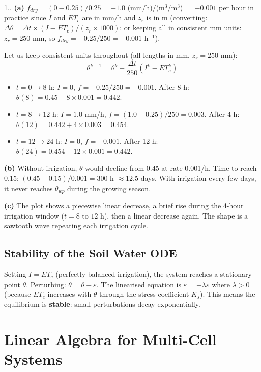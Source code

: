 \documentclass[12pt,a4paper,openany]{book}
\newcounter{exoctr}[chapter]
\renewcommand{\theexoctr}{\thechapter.\arabic{exoctr}}
\begin{document}
\begin{solbox}{1.\theexoctr}
\textbf{(a)} $f_{dry}=(0-0.25)/0.25=-1.0$ (mm/h)/(m$^3$/m$^3$) $= -0.001$ per hour in practice since $I$ and $ET_c$ are in mm/h and $z_r$ is in m (converting: $\Delta\theta = \Delta t \times (I-ET_c)/(z_r \times 1000)$; or keeping all in consistent mm units: $z_r=250$ mm, so $f_{dry}=-0.25/250=-0.001$ h$^{-1}$).

Let us keep consistent units throughout (all lengths in mm, $z_r=250$ mm):
\[\theta^{k+1}=\theta^k+\frac{\Delta t}{250}(I^k-ET_c^k)\]
\begin{itemize}
  \item $t=0\to8$ h: $I=0$, $f=-0.25/250=-0.001$. After 8 h: $\theta(8)=0.45-8\times0.001=0.442$.
  \item $t=8\to12$ h: $I=1.0$ mm/h, $f=(1.0-0.25)/250=0.003$. After 4 h: $\theta(12)=0.442+4\times0.003=0.454$.
  \item $t=12\to24$ h: $I=0$, $f=-0.001$. After 12 h: $\theta(24)=0.454-12\times0.001=0.442$.
\end{itemize}
\textbf{(b)} Without irrigation, $\theta$ would decline from 0.45 at rate 0.001/h. Time to reach 0.15: $(0.45-0.15)/0.001=300$ h $\approx 12.5$ days. With irrigation every few days, it never reaches $\theta_{wp}$ during the growing season.

\textbf{(c)} The plot shows a piecewise linear decrease, a brief rise during the 4-hour irrigation window ($t=8$ to $12$ h), then a linear decrease again. The shape is a sawtooth wave repeating each irrigation cycle.
\end{solbox}

\section{Stability of the Soil Water ODE}

Setting $I=ET_c$ (perfectly balanced irrigation), the system reaches a stationary point $\bar\theta$. Perturbing: $\theta = \bar\theta + \varepsilon$. The linearised equation is $\dot\varepsilon = -\lambda\varepsilon$ where $\lambda>0$ (because $ET_c$ increases with $\theta$ through the stress coefficient $K_s$). This means the equilibrium is \textbf{stable}: small perturbations decay exponentially.

\chapter{Linear Algebra for Multi-Cell Systems}
\label{chap:linalg}
\end{document}
